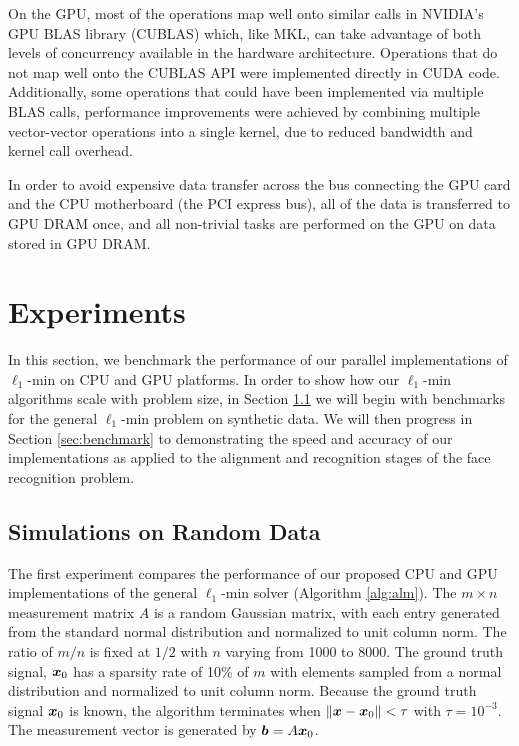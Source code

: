 \documentclass[preprint]{sigplanconf}
\begin{document}
On the GPU, most of the operations map well onto similar calls in NVIDIA's GPU
BLAS library (CUBLAS) which, like MKL, can take advantage of both levels of
concurrency available in the hardware architecture.  Operations that do not map
well onto the CUBLAS API were implemented directly in CUDA code.
Additionally, some operations that could have been implemented via multiple
BLAS calls, performance improvements were achieved by combining multiple
vector-vector operations into a single kernel, due to reduced bandwidth and
kernel call overhead.  

In order to avoid expensive data transfer across the bus connecting the GPU
card and the CPU motherboard (the PCI express bus), all of the data is
transferred to GPU DRAM once, and all non-trivial tasks are performed on the
GPU on data stored in GPU DRAM.  

\section{Experiments} 
\label{sec:experiment} 
In this section, we benchmark the
performance of our parallel implementations of $\ell_1$-min on CPU and GPU
platforms.  In order to show how our $\ell_1$-min algorithms scale with problem
size, in Section \ref{sec:simulation} we will begin with benchmarks for the
general $\ell_1$-min problem on synthetic data.  We will then progress in
Section \ref{sec:benchmark} to demonstrating the speed and accuracy of our
implementations as applied to the alignment and recognition stages of the face
recognition problem.

\subsection{Simulations on Random Data}
\label{sec:simulation}

The first experiment compares the performance of our proposed CPU and GPU
implementations of the general $\ell_1$-min solver (Algorithm \eqref{alg:alm}).
The $m \times n$ measurement matrix $A$ is a random Gaussian matrix, with each
entry generated from the standard normal distribution and normalized to unit
column norm.  The ratio of $m/n$ is fixed at $1/2$ with $n$ varying from 1000 to 8000.
The ground truth signal, ${\boldsymbol{x}}_0$ has a sparsity rate of 10\% of $m$ with
elements sampled from a normal distribution and normalized to unit column
norm.  Because the ground truth signal ${\boldsymbol{x}}_0$ is known, the algorithm
terminates when $\|{\boldsymbol x}-{\boldsymbol x}_0\| < \tau$ with $\tau=10^{-3}$.  The measurement
vector is generated by ${\boldsymbol{b}} = A {\boldsymbol{x}}_0$.   
\end{document}
